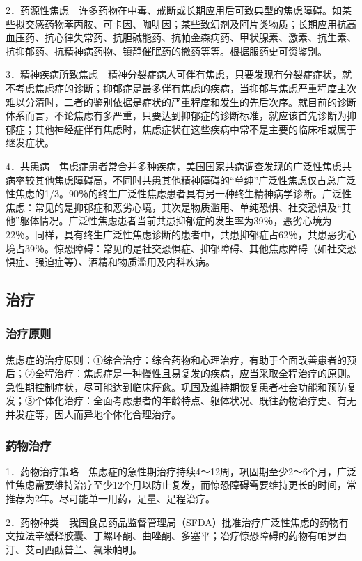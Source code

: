 2．药源性焦虑　许多药物在中毒、戒断或长期应用后可致典型的焦虑障碍。如某些拟交感药物苯丙胺、可卡因、咖啡因；某些致幻剂及阿片类物质；长期应用抗高血压药、抗心律失常药、抗胆碱能药、抗帕金森病药、甲状腺素、激素、抗生素、抗抑郁药、抗精神病药物、镇静催眠药的撤药等等。根据服药史可资鉴别。

3．精神疾病所致焦虑　精神分裂症病人可伴有焦虑，只要发现有分裂症症状，就不考虑焦虑症的诊断；抑郁症是最多伴有焦虑的疾病，当抑郁与焦虑严重程度主次难以分清时，二者的鉴别依据是症状的严重程度和发生的先后次序。就目前的诊断体系而言，不论焦虑有多严重，只要达到抑郁症的诊断标准，就应该首先诊断为抑郁症；其他神经症伴有焦虑时，焦虑症状在这些疾病中常不是主要的临床相或属于继发症状。

4．共患病　焦虑症患者常合并多种疾病，美国国家共病调查发现的广泛性焦虑共病率较其他焦虑障碍高，不同时共患其他精神障碍的“单纯”广泛性焦虑仅占总广泛性焦虑的1/3。90％的终生广泛性焦虑患者具有另一种终生精神病学诊断。广泛性焦虑：常见的是抑郁症和恶劣心境，其次是物质滥用、单纯恐惧、社交恐惧及“其他”躯体情况。广泛性焦虑患者当前共患抑郁症的发生率为39％，恶劣心境为22％。同样，具有终生广泛性焦虑诊断的患者中，共患抑郁症占62％，共患恶劣心境占39％。惊恐障碍：常见的是社交恐惧症、抑郁障碍、其他焦虑障碍（如社交恐惧症、强迫症等）、酒精和物质滥用及内科疾病。

\subsection{治疗}

\subsubsection{治疗原则}

焦虑症的治疗原则：①综合治疗：综合药物和心理治疗，有助于全面改善患者的预后；②全程治疗：焦虑症是一种慢性且易复发的疾病，应当采取全程治疗的原则。急性期控制症状，尽可能达到临床痊愈。巩固及维持期恢复患者社会功能和预防复发；③个体化治疗：全面考虑患者的年龄特点、躯体状况、既往药物治疗史、有无并发症等，因人而异地个体化合理治疗。

\subsubsection{药物治疗}

1．药物治疗策略　焦虑症的急性期治疗持续4～12周，巩固期至少2～6个月，广泛性焦虑需要维持治疗至少12个月以防止复发，而惊恐障碍需要维持更长的时间，常推荐为2年。尽可能单一用药，足量、足程治疗。

2．药物种类　我国食品药品监督管理局（SFDA）批准治疗广泛性焦虑的药物有文拉法辛缓释胶囊、丁螺环酮、曲唑酮、多塞平；冶疗惊恐障碍的药物有帕罗西汀、艾司西酞普兰、氯米帕明。


